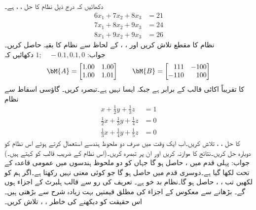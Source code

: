 \quad
دکھائیں کہ درج ذیل نظام کا حل ، ،  ہے۔
\begin{align*}
6x_1+7x_2+8x_3&=21\\
7x_1+8x_2+9x_3&=24\\
8x_1+9x_2+9x_3&=26
\end{align*}
نظام کا مقطع تلاش کریں اور ، ،  کے لحاظ سے نظام کا بقیہ حاصل کریں۔\\
جواب:\quad
$1;\quad -0.1,0.1,0$
\quad
دکھائیں کہ
\begin{align*}
\bM{A}=\begin{bmatrix}1.00&1.00\\1.00&1.01  \end{bmatrix}\quad\quad
\bM{B}=\begin{bmatrix*}[r]111&-100\\-110&100  \end{bmatrix*}
\end{align*}
کا  تقریباً اکائی قالب کے برابر ہے جبکہ  ایسا نہیں ہے۔تبصرہ کریں۔
\quad {}  \quad 
گاؤسی اسقاط سے نظام
\begin{align*}
x+\tfrac{1}{2}y+\tfrac{1}{3}z&=1\\
\tfrac{1}{2}x+\tfrac{1}{3}y+\tfrac{1}{4}z&=0\\
\tfrac{1}{3}x+\tfrac{1}{4}y+\tfrac{1}{5}z&=0
\end{align*}
کا حل ، ،  تلاش کریں۔اب ایک وقت میں صرف دو ملحوظ ہندسے استعمال کرتے ہوئے اس نظام کو دوبارہ حل کریں۔نتائج کا موازنہ کریں اور ان پر تبصرہ کریں۔(اس نظام کے  ضریب  قالب کو    کہتے ہیں۔)\\
جواب:\quad
پہلی قدم میں ،  حاصل ہو گا جہاں  کو دو ملحوظ ہندسوں میں عمومی قاعدہ کے تحت  لکھا گیا ہے۔دوسری قدم میں  حاصل ہو گا جو کوئی معنی نہیں رکھتا ہے۔اگر ہم  کو  لکھیں تب ، ،  حاصل ہو گا۔نظام بد خو ہے۔
\quad 
تعریف کی رو سے  قالب ہلبرٹ   کے اجزاء  ہوں گے۔ بڑھانے سے معکوس  کے اجزاء کی مطلق قیمتیں بہت زیادہ شرح سے بڑھتی ہیں۔اس حقیقت کو دیکھنے کی خاطر ، ، تلاش کریں۔


